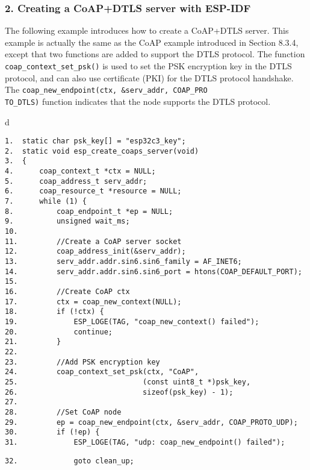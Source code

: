 \documentclass[a4paper,12pt]{book}
\begin{document}
\subsubsection{2. Creating a CoAP+DTLS server with ESP-IDF}
The following example introduces how to create a CoAP+DTLS server. This example is actually the same as the CoAP example introduced in Section 8.3.4, except that two functions are added to support the DTLS protocol. The function \verb|coap_context_set_psk()| is used to set the PSK encryption key in the DTLS protocol, and can also use certificate (PKI) for the DTLS protocol handshake. The \verb|coap_new_endpoint(ctx, &serv_addr, COAP_PRO|\\ \verb|TO_DTLS)| function indicates that the node supports the DTLS protocol.


\begin{codebloc}
\begin{tabular}{d}
\vspace{2pt}
\begin{verbatim}
1.  static char psk_key[] = "esp32c3_key";
2.  static void esp_create_coaps_server(void)
3.  {
4.      coap_context_t *ctx = NULL;
5.      coap_address_t serv_addr;
6.      coap_resource_t *resource = NULL;
7.      while (1) {
8.          coap_endpoint_t *ep = NULL;
9.          unsigned wait_ms;
10.	
11.         //Create a CoAP server socket
12.         coap_address_init(&serv_addr);
13.         serv_addr.addr.sin6.sin6_family = AF_INET6;
14.         serv_addr.addr.sin6.sin6_port = htons(COAP_DEFAULT_PORT);
15.	
16.         //Create CoAP ctx
17.         ctx = coap_new_context(NULL);
18.         if (!ctx) {
19.             ESP_LOGE(TAG, "coap_new_context() failed");
20.             continue;
21.         }
22.	
23.         //Add PSK encryption key
24.         coap_context_set_psk(ctx, "CoAP",
25.                             (const uint8_t *)psk_key,
26.                             sizeof(psk_key) - 1);
27.	
28.         //Set CoAP node
29.         ep = coap_new_endpoint(ctx, &serv_addr, COAP_PROTO_UDP);
30.         if (!ep) {
31.             ESP_LOGE(TAG, "udp: coap_new_endpoint() failed");
\end{verbatim}
\verb|32.             goto clean_up;|
\end{tabular}
\end{codebloc}
\end{document}
